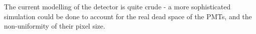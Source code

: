 The current modelling of the detector is quite crude - a more sophisticated simulation could be done to account for the real dead space of the PMTs, and the non-uniformity of their pixel size. 



\endinput 

Any text after an \endinput is ignored.
You could put scraps here or things in progress.
